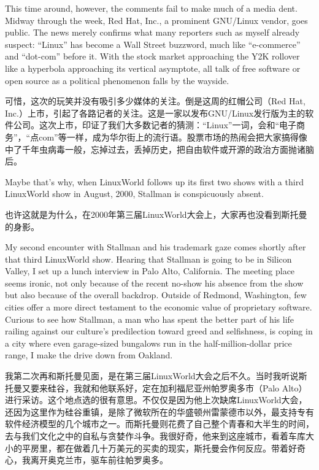 \ifdefined\eng
This time around, however, the comments fail to make much of a media dent. Midway through the week, Red Hat, Inc., a prominent GNU/Linux vendor, goes public. The news merely confirms what many reporters such as myself already suspect: ``Linux'' has become a Wall Street buzzword, much like ``e-commerce'' and ``dot-com'' before it. With the stock market approaching the Y2K rollover like a hyperbola approaching its vertical asymptote, all talk of free software or open source as a political phenomenon falls by the wayside.
\fi

\ifdefined\chs
可惜，这次的玩笑并没有吸引多少媒体的关注。倒是这周的红帽公司（Red Hat, Inc.）上市，引起了各路记者的关注。这是一家以发布GNU/Linux发行版为主的软件公司。这次上市，印证了我们大多数记者的猜测：``Linux''一词，会和``电子商务''，``点com''等一样，成为华尔街上的流行语。股票市场的热闹会把大家搞得像中了千年虫病毒一般，忘掉过去，丢掉历史，把自由软件或开源的政治方面抛诸脑后。
\fi

\ifdefined\eng
Maybe that's why, when LinuxWorld follows up its first two shows with a third LinuxWorld show in August, 2000, Stallman is conspicuously absent.
\fi

\ifdefined\chs
也许这就是为什么，在2000年第三届LinuxWorld大会上，大家再也没看到斯托曼的身影。
\fi

\ifdefined\eng
My second encounter with Stallman and his trademark gaze comes shortly after that third LinuxWorld show. Hearing that Stallman is going to be in Silicon Valley, I set up a lunch interview in Palo Alto, California. The meeting place seems ironic, not only because of \ifdefined\vone the recent no-show \fi\ifdefined\vtwo his absence from the show \fi but also because of the overall backdrop. Outside of Redmond, Washington, few cities offer a more direct testament to the economic value of proprietary software. Curious to see how Stallman, a man who has spent the better part of his life railing against our culture's predilection toward greed and selfishness, is coping in a city where even garage-sized bungalows run in the half-million-dollar price range, I make the drive down from Oakland.
\fi

\ifdefined\chs
我第二次再和斯托曼见面，是在第三届LinuxWorld大会之后不久。当时我听说斯托曼又要来硅谷，我就和他联系好，定在加利福尼亚州帕罗奥多市（Palo Alto）进行采访。这个地点选的很有意思。不仅仅是因为他上次缺席LinuxWorld大会，还因为这里作为硅谷重镇，是除了微软所在的华盛顿州雷蒙德市以外，最支持专有软件经济模型的几个城市之一。而斯托曼则花费了自己整个青春和大半生的时间，去与我们文化之中的自私与贪婪作斗争。我很好奇，他来到这座城市，看着车库大小的平房里，都在做着几十万美元的买卖的现实，斯托曼会作何反应。带着好奇心，我离开奥克兰市，驱车前往帕罗奥多。
\fi

